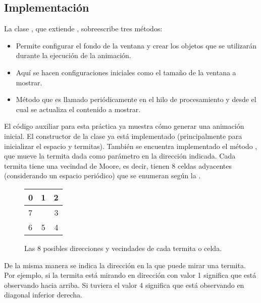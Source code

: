 \subsection{Implementaci\'on}


La clase , que extiende , sobreescribe tres métodos:
\begin{itemize}
 \item {} Permite configurar el fondo de la ventana y crear los objetos que se utilizarán durante la ejecución de la animación.

 \item {} Aquí se hacen configuraciones iniciales como el tamaño de la ventana a mostrar.

 \item {} Método que es llamado periódicamente en el hilo de procesamiento y desde el cual se actualiza el contenido a mostrar.
\end{itemize}

El código auxiliar para esta práctica ya muestra cómo generar una animación inicial.  El constructor de la clase  ya está implementado (principalmente para inicializar el espacio y termitas). También se encuentra implementado el método , que mueve la termita dada como parámetro en la dirección indicada. Cada termita tiene una vecindad de Moore, es decir, tienen 8 celdas adyacentes (considerando un espacio periódico) que se enumeran según la .

\begin{figure}
  \begin{center}
    \begin{tabular}{| l | c | r |}
      \hline
      0 & 1 & 2 \\ \hline
      7 &   & 3 \\ \hline
      6 & 5 & 4 \\
      \hline
    \end{tabular}
  \end{center}
  \caption{Las 8 posibles direcciones y vecindades de cada termita o celda.}
  \label{fig:dirsposibles1}
\end{figure}

De la misma manera se indica la dirección en la que puede mirar una termita. Por ejemplo, si la termita está mirando en dirección con valor 1 significa que está observando hacia arriba. Si tuviera el valor 4 significa que está observando en diagonal inferior derecha.

